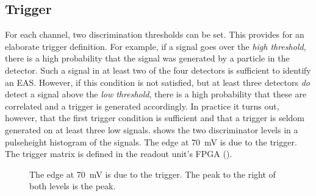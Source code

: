 \subsection{Trigger}
\label{sec:trigger}

For each channel, two discrimination thresholds can be set.  This provides for
an elaborate trigger definition.  For example, if a signal goes over the
\emph{high threshold}, there is a high probability that the signal was
generated by a particle in the detector.
Such a signal in at least two of the four detectors is sufficient to identify an
EAS.
However, if this condition is not satisfied, but at least
three detectors \emph{do} detect a signal above the \emph{low threshold},
there is a high probability that these are correlated and a trigger is
generated accordingly.
In practice it turns out, however, that the first trigger condition is sufficient
and that a trigger is seldom generated on at least three low signals.
 shows the two discriminator levels in a
pulseheight histogram of the \hisparc signals. The edge at \SI{70}{\milli\volt}
is due to the trigger. The trigger matrix is defined in the readout unit's FPGA
().

\begin{figure}
\centering

\caption{  The edge at \SI{70}{\milli\volt} is due to
the trigger.  The peak to the right of both levels is the \mip peak.}
\label{fig:trigger-levels}
\end{figure}

